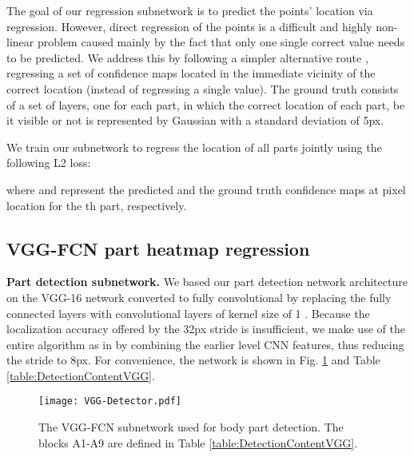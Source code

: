 \documentclass[runningheads]{llncs}
\begin{document}
The goal of our regression subnetwork is to predict the points' location via regression. However, direct regression of the points is a difficult and highly non-linear problem caused mainly by the fact that only one single correct value needs to be predicted. We address this by following a simpler alternative route \cite{tompson2014joint, pfister2015flowing}, regressing a set of confidence maps located in the immediate vicinity of the correct location (instead of regressing a single value). The ground truth consists of a set of  layers, one for each part, in which the correct location of each part, be it visible or not is represented by Gaussian with a standard deviation of 5px.

We train our subnetwork to regress the location of all parts jointly using the following L2 loss:
 

where  and  represent the predicted and the ground truth confidence maps at pixel location  for the th part, respectively.

\subsection{VGG-FCN part heatmap regression}

\textbf{Part detection subnetwork.} We based our part detection network architecture on the VGG-16 network \cite{simonyan2014very} converted to fully convolutional by replacing the fully connected layers with convolutional layers of kernel size of 1 \cite{long2015fully}. Because the localization accuracy offered by the 32px stride is insufficient, we make use of the entire algorithm as in \cite{long2015fully} by combining the earlier level CNN features, thus reducing the stride to 8px. For convenience, the network is shown in Fig. \ref{fig:OurDetNetworkVGG} and Table \ref{table:DetectionContentVGG}.

\begin{figure}
\centering 
\texttt{[image: VGG-Detector.pdf]}
\caption{The VGG-FCN subnetwork used for body part detection. The blocks A1-A9 are defined in Table \ref{table:DetectionContentVGG}.}
\label{fig:OurDetNetworkVGG}
\end{figure} 
\end{document}
